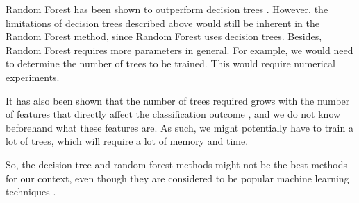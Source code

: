 \documentclass[12pt, twoside, a4paper]{report}
\begin{document}
Random Forest has been shown to outperform decision trees \cite{RefWorks:103}. However, the limitations of decision trees described above would still be inherent in the Random Forest method, since Random Forest uses decision trees. Besides, Random Forest requires more parameters in general. For example, we would need to determine the number of trees to be trained. This would require numerical experiments.

It has also been shown that the number of trees required grows with the number of features that directly affect the classification outcome \cite{RefWorks:102}, and we do not know beforehand what these features are. As such, we might potentially have to train a lot of trees, which will require a lot of memory and time.

So, the decision tree and random forest methods might not be the best methods for our context, even though they are considered to be popular machine learning techniques \cite{RefWorks:103}.
\end{document}
